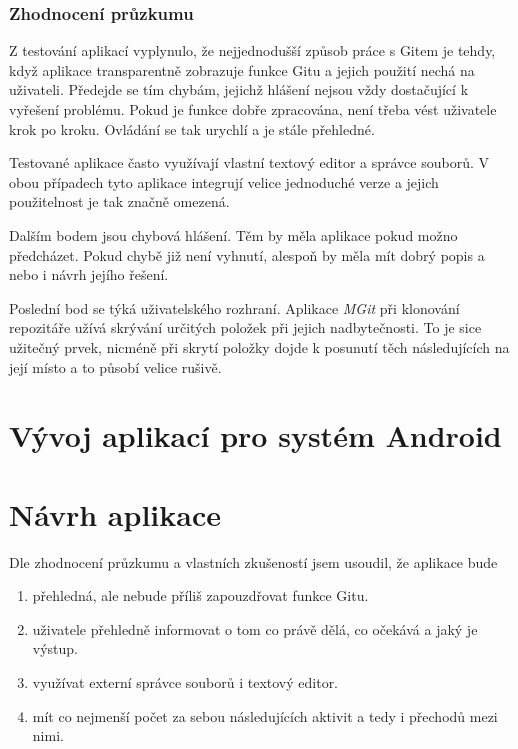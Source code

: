         \subsection{Zhodnocení průzkumu}
        Z testování aplikací vyplynulo, že nejjednodušší způsob práce s Gitem je tehdy, když aplikace transparentně zobrazuje funkce Gitu a jejich použití nechá na uživateli. Předejde se tím chybám, jejichž hlášení nejsou vždy dostačující k vyřešení problému. Pokud je funkce dobře zpracována, není třeba vést uživatele krok po kroku. Ovládání se tak urychlí a je stále přehledné.

        Testované aplikace často využívají vlastní textový editor a správce souborů. V obou případech tyto aplikace integrují velice jednoduché verze a jejich použitelnost je tak značně omezená.

        Dalším bodem jsou chybová hlášení. Těm by měla aplikace pokud možno předcházet. Pokud chybě již není vyhnutí, alespoň by měla mít dobrý popis a nebo i návrh jejího řešení.

        Poslední bod se týká uživatelského rozhraní. Aplikace \emph{MGit} při klonování repozitáře užívá skrývání určitých položek při jejich nadbytečnosti. To je sice užitečný prvek, nicméně při skrytí položky dojde k posunutí těch následujících na její místo a to působí velice rušivě.

\chapter{Vývoj aplikací pro systém Android}

\chapter{Návrh aplikace}
    Dle zhodnocení průzkumu a vlastních zkušeností jsem usoudil, že aplikace bude
    \begin{enumerate}
        \item přehledná, ale nebude příliš zapouzdřovat funkce Gitu.
        \item uživatele přehledně informovat o tom co právě dělá, co očekává a jaký je výstup.
        \item využívat externí správce souborů i textový editor.
        \item mít co nejmenší počet za sebou následujících aktivit a tedy i přechodů mezi nimi.
    \end{enumerate}

